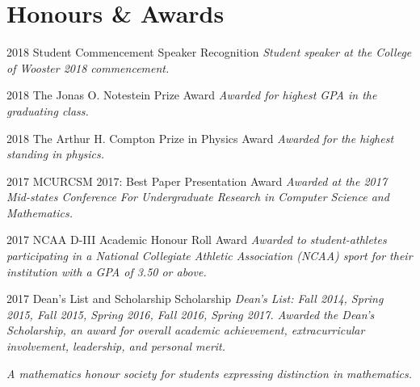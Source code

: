 \documentclass[]{friggeri-cv}
\begin{document}
\section{Honours \& Awards}
\begin{entrylist}

    \entry
    {2018}
    {Student Commencement Speaker }
    {Recognition}
    {\emph{Student speaker at the College of Wooster 2018 commencement.\\}}
         \end{entrylist}
\begin{entrylist}
    \entry
    {2018}
    {The Jonas O. Notestein Prize}
    {Award}
    {\emph{Awarded for highest GPA in the graduating class.\\}}

    
    \entry
    {2018}
    {The Arthur H. Compton Prize in Physics}
    {Award}
    {\emph{Awarded for the highest standing in physics.\\}}
    
    \entry
    {2017}
    {MCURCSM 2017: Best Paper Presentation}
    {Award}
    {\emph{Awarded at the 2017 Mid-states Conference For Undergraduate Research in Computer Science and Mathematics.\\}}

    \entry
    {2017}
    {NCAA D-III Academic Honour Roll}
    {Award}
    { \emph{Awarded to student-athletes participating in a National Collegiate Athletic Association (NCAA) sport for their institution with a GPA of 3.50 or above.}\\}

  
  \entry
    {2017}
    {Dean's List and Scholarship}
    {Scholarship}
    { \emph{Dean's List: Fall 2014, Spring 2015, Fall 2015, Spring 2016, Fall 2016, Spring 2017. Awarded the Dean's Scholarship, an award for overall academic achievement, extracurricular involvement, leadership, and personal merit.}\\}

        
    

    {\emph{A mathematics honour society for students expressing distinction in mathematics.\\}}
    

\end{entrylist}
\end{document}
